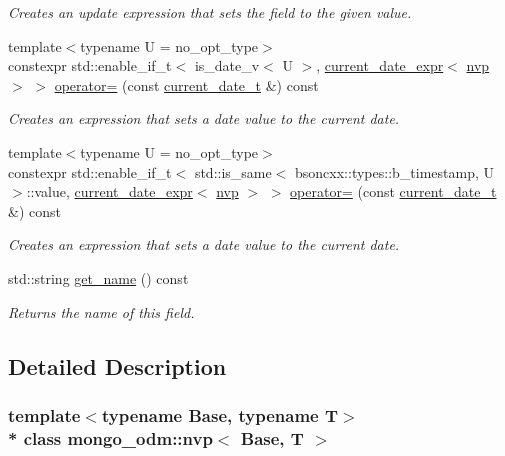 \begin{DoxyCompactItemize}
\begin{DoxyCompactList}\small\item\em Creates an update expression that sets the field to the given value. \end{DoxyCompactList}\item 
{\footnotesize template$<$typename U  = no\+\_\+opt\+\_\+type$>$ }\\constexpr std\+::enable\+\_\+if\+\_\+t$<$ is\+\_\+date\+\_\+v$<$ U $>$, \hyperlink{classmongo__odm_1_1current__date__expr}{current\+\_\+date\+\_\+expr}$<$ \hyperlink{classmongo__odm_1_1nvp}{nvp} $>$ $>$ \hyperlink{classmongo__odm_1_1nvp_a539845d88858839cca195bc9242c955a}{operator=} (const \hyperlink{structmongo__odm_1_1current__date__t}{current\+\_\+date\+\_\+t} \&) const 
\begin{DoxyCompactList}\small\item\em Creates an expression that sets a date value to the current date. \end{DoxyCompactList}\item 
{\footnotesize template$<$typename U  = no\+\_\+opt\+\_\+type$>$ }\\constexpr std\+::enable\+\_\+if\+\_\+t$<$ std\+::is\+\_\+same$<$ bsoncxx\+::types\+::b\+\_\+timestamp, U $>$\+::value, \hyperlink{classmongo__odm_1_1current__date__expr}{current\+\_\+date\+\_\+expr}$<$ \hyperlink{classmongo__odm_1_1nvp}{nvp} $>$ $>$ \hyperlink{classmongo__odm_1_1nvp_a736412364cab3e84b4a2e68788a79125}{operator=} (const \hyperlink{structmongo__odm_1_1current__date__t}{current\+\_\+date\+\_\+t} \&) const 
\begin{DoxyCompactList}\small\item\em Creates an expression that sets a date value to the current date. \end{DoxyCompactList}\item 
std\+::string \hyperlink{classmongo__odm_1_1nvp_a36c3a03b263756a1d5e74da5a8c4401d}{get\+\_\+name} () const 
\begin{DoxyCompactList}\small\item\em Returns the name of this field. \end{DoxyCompactList}\end{DoxyCompactItemize}


\subsection{Detailed Description}
\subsubsection*{template$<$typename Base, typename T$>$\\*
class mongo\+\_\+odm\+::nvp$<$ Base, T $>$}

